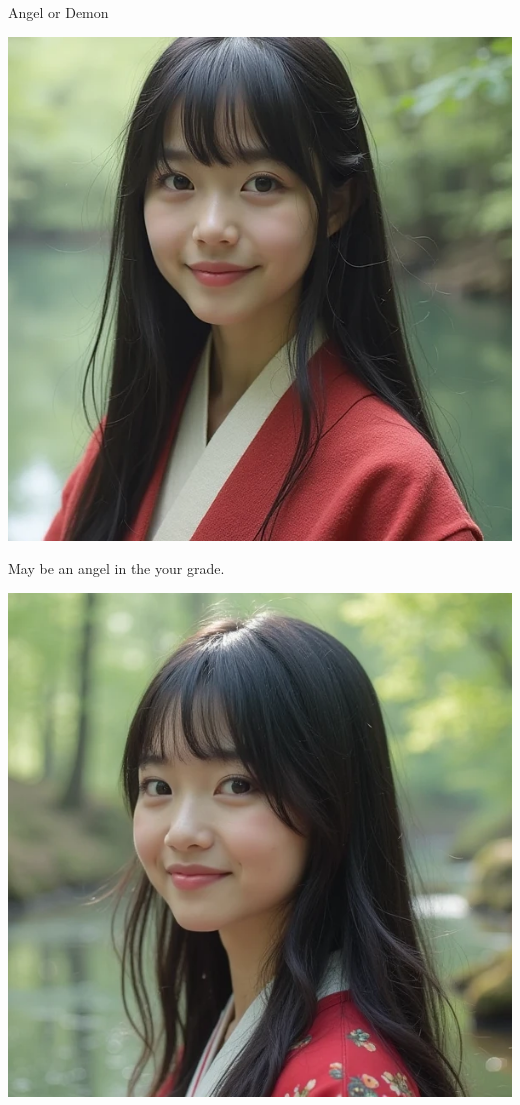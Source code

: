 \documentclass{beamer}
\begin{document}
\begin{frame}{Angel or Demon}
\begin{minipage}{0.45\textwidth}
\begin{center}
\includegraphics[width=\textwidth]{heal.png}
\end{center}
\begin{center}
May be an angel in the your grade.
\end{center}
\end{minipage}
\hfill
\begin{minipage}{0.45\textwidth}
\begin{center}
\includegraphics[width=\textwidth]{kill.png}

\end{center}
\end{minipage}
\end{frame}
\end{document}
